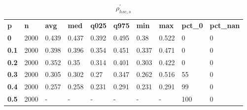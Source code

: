 \begin{table}[h]
 \centering 
\footnotesize
\caption{$\rho_{hsc,s}^\prime $}
\label{tab:alphahscs}
\begin{tabular}[h]{| l l l l l l l l l l|
    } \hline
\textbf{ p} & \textbf{ n} & \textbf{ avg} & \textbf{ med} & \textbf{ q025} & \textbf{ q975} & \textbf{ min} & \textbf{ max} & \textbf{ pct\_0} & \textbf{ pct\_nan}
           \\
  \textbf{  0} & 2000 & 0.439 & 0.437 & 0.392 & 0.495 &  0.38 & 0.522 &   0 & 0
           \\
  \textbf{0.1} & 2000 & 0.398 & 0.396 & 0.354 & 0.451 & 0.337 & 0.471 &   0 & 0
           \\
  \textbf{0.2} & 2000 & 0.352 &  0.35 & 0.314 & 0.401 & 0.303 & 0.422 &   0 & 0
           \\
  \textbf{0.3} & 2000 & 0.305 & 0.302 &  0.27 & 0.347 & 0.262 & 0.516 &  55 & 0
           \\
  \textbf{0.4} & 2000 & 0.257 & 0.258 & 0.231 & 0.291 & 0.231 & 0.291 &  99 & 0
           \\
  \textbf{0.5} & 2000 & - & - & - & - & - & - & 100 & 0
           \\
 \hline \end{tabular}
 \end{table}

